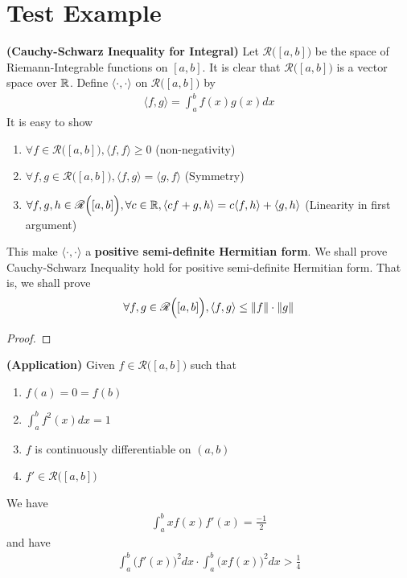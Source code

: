 \documentclass{report}
\begin{document}
\section{Test Example}
\begin{theorem}
\textbf{(Cauchy-Schwarz Inequality for Integral)} Let $\mathscr{R}\Big([a,b] \Big)$ be the space of Riemann-Integrable functions on $[a,b]$. It is clear that $\mathscr{R}\Big([a,b] \Big)$ is a vector space over $\mathbb{R}$.  Define $\langle \cdot , \cdot \rangle $ on $\mathscr{R}\Big([a,b] \Big)$ by 
\begin{align*}
\langle f,g\rangle = \int_a^b f(x)g(x)dx
\end{align*}
It is easy to show  
\begin{enumerate}[label=(\alph*)]
  \item $ \forall f \in \mathscr{R}\Big([a,b] \Big), \langle f,f\rangle \geq 0 $ (non-negativity) 
  \item $\forall f,g \in \mathscr{R}\Big([a,b] \Big),\langle f,g\rangle =\langle g,f\rangle $ (Symmetry)
  \item $\forall f,g,h \in \mathscr{R}\Big([a,b] \Big),\forall c \in \mathbb{R}, \langle cf+g,h\rangle =c\langle f,h\rangle +\langle g,h \rangle $ (Linearity in first argument)
\end{enumerate}
This make $\langle \cdot,\cdot\rangle $ a \textbf{positive semi-definite Hermitian form}. We shall prove Cauchy-Schwarz Inequality hold for positive semi-definite Hermitian form. That is, we shall prove 
\begin{align*}
\forall f ,g \in \mathscr{R}\Big([a,b] \Big),\langle f,g \rangle \leq \| f \|\cdot \| g \|
\end{align*}
\end{theorem}
\begin{proof}
\end{proof}
\begin{theorem}
\textbf{(Application)} Given $f \in \mathscr{R}\Big([a,b] \Big)$ such that 
\begin{enumerate}[label=(\alph*)]
  \item $f(a)=0=f(b)$ 
  \item $\int_a^b f^2 (x)dx =1$ 
  \item $f$ is continuously differentiable on  $(a,b)$
  \item $f' \in \mathscr{R}\Big([a,b] \Big)$
\end{enumerate}
We have 
\begin{align*}
\int_a^b xf(x)f'(x)=\frac{-1}{2}
\end{align*}
and have 
\begin{align*}
\int_a^b \big(f'(x) \big)^2 dx \cdot \int_a^b \big(xf(x) \big)^2 dx>\frac{1}{4}
\end{align*}


\end{theorem}
\end{document}
